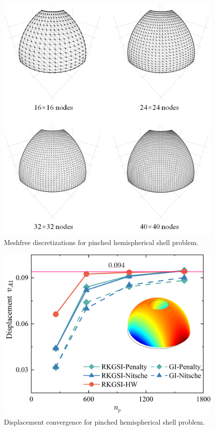 \begin{figure}[!ht]
\centering
\includegraphics[width=\textwidth]{figures/pfmsh_r1}
\caption{Meshfree discretizations for pinched hemispherical shell problem.}\label{phfm}
\end{figure}
\begin{figure}[!ht]
\centering
\includegraphics[width=\textwidth]{figures/pfd_r1}
\caption{Displacement convergence for pinched hemispherical shell problem.}\label{phf2}
\end{figure}
